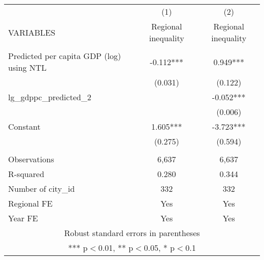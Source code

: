 \documentclass[]{article}
\begin{document}
\begin{tabular}{lcc} \hline
 & (1) & (2) \\
VARIABLES & Regional inequality & Regional inequality \\ \hline
 &  &  \\
Predicted per capita GDP (log) using NTL & -0.112*** & 0.949*** \\
 & (0.031) & (0.122) \\
lg\_gdppc\_predicted\_2 &  & -0.052*** \\
 &  & (0.006) \\
Constant & 1.605*** & -3.723*** \\
 & (0.275) & (0.594) \\
 &  &  \\
Observations & 6,637 & 6,637 \\
R-squared & 0.280 & 0.344 \\
Number of city\_id & 332 & 332 \\
Regional FE & Yes & Yes \\
 Year FE & Yes & Yes \\ \hline
\multicolumn{3}{c}{ Robust standard errors in parentheses} \\
\multicolumn{3}{c}{ *** p$<$0.01, ** p$<$0.05, * p$<$0.1} \\
\end{tabular}
\end{document}
